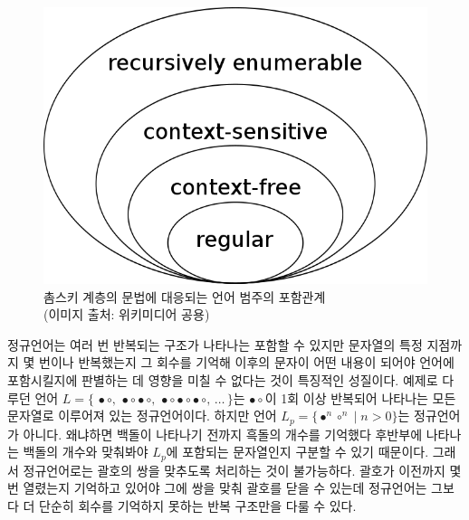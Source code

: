 \documentclass[b5paper,chapter,figtabcapt]{oblivoir}
\newcommand{\txtbullet}[0]{\ensuremath{\bullet}}
\newcommand{\txtcircle}[0]{\ensuremath{\circ}}
\begin{document}
\begin{figure}[b]\centering
\includegraphics[scale=0.5]{imgs/ChomskyHierarchy.png}
\caption{촘스키 계층의 문법에 대응되는 언어 범주의 포함관계
         \label{fig:ChomskyHierarchyLang}\\
         {\scriptsize(이미지 출처: 위키미디어 공용)} }
\end{figure}

정규언어는 여러 번 반복되는 구조가 나타나는 포함할 수 있지만
문자열의 특정 지점까지 몇 번이나 반복했는지 그 회수를 기억해
이후의 문자이 어떤 내용이 되어야 언어에 포함시킬지에 판별하는 데
영향을 미칠 수 없다는 것이 특징적인 성질이다. 예제로 다루던 언어
$L = \{\, \txtbullet\txtcircle
      ,\, \txtbullet\txtcircle\txtbullet\txtcircle
      ,\, \txtbullet\txtcircle\txtbullet\txtcircle\txtbullet\txtcircle
      ,\, \ldots
   \,\}$는 $\txtbullet\txtcircle$이 1회 이상 반복되어 나타나는
모든 문자열로 이루어져 있는 정규언어이다.
하지만 언어 $L_p = \{\txtbullet^n\txtcircle^n \mid n>0\}$는
정규언어가 아니다. 왜냐하면 백돌이 나타나기 전까지 흑돌의 개수를
기억했다 후반부에 나타나는 백돌의 개수와 맞춰봐야 $L_p$에 포함되는
문자열인지 구분할 수 있기 때문이다. 그래서 정규언어로는 괄호의 쌍을
맞추도록 처리하는 것이 불가능하다. 괄호가 이전까지 몇 번 열렸는지
기억하고 있어야 그에 쌍을 맞춰 괄호를 닫을 수 있는데 정규언어는
그보다 더 단순히 회수를 기억하지 못하는 반복 구조만을 다룰 수 있다.
\end{document}
